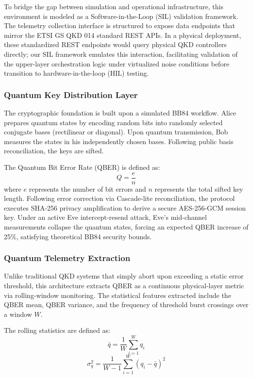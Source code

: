 \documentclass[conference]{IEEEtran}
\begin{document}
To bridge the gap between simulation and operational infrastructure, this environment is modeled as a Software-in-the-Loop (SIL) validation framework. The telemetry collection interface is structured to expose data endpoints that mirror the ETSI GS QKD 014 standard REST APIs. In a physical deployment, these standardized REST endpoints would query physical QKD controllers directly; our SIL framework emulates this interaction, facilitating validation of the upper-layer orchestration logic under virtualized noise conditions before transition to hardware-in-the-loop (HIL) testing.

\subsubsection{Quantum Key Distribution Layer}
The cryptographic foundation is built upon a simulated BB84 workflow. Alice prepares quantum states by encoding random bits into randomly selected conjugate bases (rectilinear or diagonal). Upon quantum transmission, Bob measures the states in his independently chosen bases. Following public basis reconciliation, the keys are sifted. 

The Quantum Bit Error Rate (QBER) is defined as:
\begin{equation}
Q = \frac{e}{n}
\end{equation}
where $e$ represents the number of bit errors and $n$ represents the total sifted key length. Following error correction via Cascade-lite reconciliation, the protocol executes SHA-256 privacy amplification to derive a secure AES-256-GCM session key. Under an active Eve intercept-resend attack, Eve's mid-channel measurements collapse the quantum states, forcing an expected QBER increase of 25\%, satisfying theoretical BB84 security bounds.

\subsubsection{Quantum Telemetry Extraction}
Unlike traditional QKD systems that simply abort upon exceeding a static error threshold, this architecture extracts QBER as a continuous physical-layer metric via rolling-window monitoring. The statistical features extracted include the QBER mean, QBER variance, and the frequency of threshold burst crossings over a window $W$. 

The rolling statistics are defined as:
\begin{equation}
\bar{q} = \frac{1}{W} \sum_{i=1}^{W} q_i
\end{equation}
\begin{equation}
\sigma_q^2 = \frac{1}{W-1} \sum_{i=1}^{W} (q_i - \bar{q})^2
\end{equation}
\end{document}
